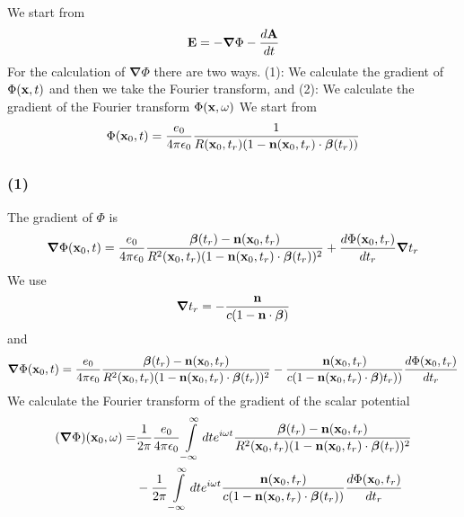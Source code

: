 We start from
\begin{align}
    {\bf E}=-{\boldsymbol{\nabla}}\Phi-\frac{d{\bf A}}{dt}
\end{align}
For the calculation of ${\boldsymbol{\nabla}}\Phi$ there are two ways. (1): We calculate the gradient of $\Phi({\bf x},t)$ and then we take the Fourier transform, and (2): We calculate the gradient of the Fourier transform $\Phi({\bf x},\omega)$
We start from
\begin{align}
    \Phi({\bf x}_0,t)=\frac{e_0}{4\pi\epsilon_0}\frac1{R({\bf x}_0,t_r)(1-{\bf n}({\bf x}_0,t_r)\cdot{\boldsymbol{\beta}}(t_r))}
\end{align}

\subsubsection{(1)}
The gradient of  $\Phi$ is
\begin{align}
    {\boldsymbol{\nabla}}\Phi({\bf x}_0,t)=\frac{e_0}{4\pi\epsilon_0}\frac{{\boldsymbol{\beta}}(t_r)-{\bf n}({\bf x}_0,t_r)}{R^2({\bf x}_0,t_r)(1-{\bf n}({\bf x}_0,t_r)\cdot{\boldsymbol{\beta}}(t_r))^2}+\frac{d\Phi({\bf x}_0,t_r)}{dt_r}{\boldsymbol{\nabla}}t_r
\end{align}
We use
\begin{align}
    {\boldsymbol{\nabla}}t_r=  -\frac{{\bf n}}{c(1-{\bf n}\cdot{\boldsymbol{\beta}})}
\end{align}
and
\begin{align}
    {\boldsymbol{\nabla}}\Phi({\bf x}_0,t)=\frac{e_0}{4\pi\epsilon_0}\frac{{\boldsymbol{\beta}}(t_r)-{\bf n}({\bf x}_0,t_r)}{R^2({\bf x}_0,t_r)(1-{\bf n}({\bf x}_0,t_r)\cdot{\boldsymbol{\beta}}(t_r))^2}-\frac{{\bf n}({\bf x}_0,t_r)}{c(1-{\bf n}({\bf x}_0,t_r)\cdot{\boldsymbol{\beta}})t_r))}\frac{d\Phi({\bf x}_0,t_r)}{dt_r}
\end{align}
We calculate the Fourier transform of the gradient of the scalar potential
\begin{align}
    ({\boldsymbol{\nabla}}\Phi)({\bf x}_0,\omega)= & \frac1{2\pi}\frac{e_0}{4\pi\epsilon_0}\int\limits_{-\infty}^{\infty}dte^{i\omega t}\frac{{\boldsymbol{\beta}}(t_r)-{\bf n}({\bf x}_0,t_r)}{R^2({\bf x}_0,t_r)(1-{\bf n}({\bf x}_0,t_r)\cdot{\boldsymbol{\beta}}(t_r))^2}\nonumber \\
                                                   & -\frac1{2\pi}\int\limits_{-\infty}^{\infty}dte^{i\omega t}\frac{{\bf n}({\bf x}_0,t_r)}{c(1-{\bf n}({\bf x}_0,t_r)\cdot{\boldsymbol{\beta}}(t_r))}\frac{d\Phi({\bf x}_0,t_r)}{dt_r}
\end{align}
